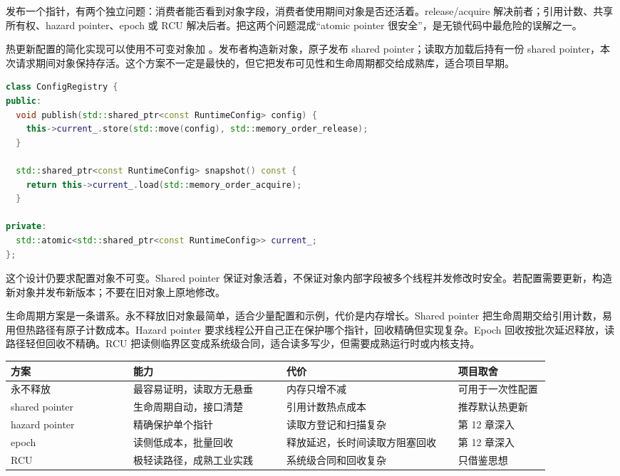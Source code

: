 发布一个指针，有两个独立问题：消费者能否看到对象字段，消费者使用期间对象是否还活着。release/acquire 解决前者；引用计数、共享所有权、hazard pointer、epoch 或 RCU 解决后者。把这两个问题混成“atomic pointer 很安全”，是无锁代码中最危险的误解之一。

热更新配置的简化实现可以使用不可变对象加 。发布者构造新对象，原子发布 shared pointer；读取方加载后持有一份 shared pointer，本次请求期间对象保持存活。这个方案不一定是最快的，但它把发布可见性和生命周期都交给成熟库，适合项目早期。

\begin{lstlisting}[language=C++,caption={热更新配置使用不可变对象和共享所有权}]
class ConfigRegistry {
public:
  void publish(std::shared_ptr<const RuntimeConfig> config) {
    this->current_.store(std::move(config), std::memory_order_release);
  }

  std::shared_ptr<const RuntimeConfig> snapshot() const {
    return this->current_.load(std::memory_order_acquire);
  }

private:
  std::atomic<std::shared_ptr<const RuntimeConfig>> current_;
};
\end{lstlisting}

这个设计仍要求配置对象不可变。Shared pointer 保证对象活着，不保证对象内部字段被多个线程并发修改时安全。若配置需要更新，构造新对象并发布新版本；不要在旧对象上原地修改。

生命周期方案是一条谱系。永不释放旧对象最简单，适合少量配置和示例，代价是内存增长。Shared pointer 把生命周期交给引用计数，易用但热路径有原子计数成本。Hazard pointer 要求线程公开自己正在保护哪个指针，回收精确但实现复杂。Epoch 回收按批次延迟释放，读路径轻但回收不精确。RCU 把读侧临界区变成系统级合同，适合读多写少，但需要成熟运行时或内核支持。

\begin{center}
\begin{tabular}{p{0.20\linewidth}p{0.25\linewidth}p{0.28\linewidth}p{0.15\linewidth}}
\toprule
方案 & 能力 & 代价 & 项目取舍 \\
\midrule
永不释放 & 最容易证明，读取方无悬垂 & 内存只增不减 & 可用于一次性配置 \\
shared pointer & 生命周期自动，接口清楚 & 引用计数热点成本 & 推荐默认热更新 \\
hazard pointer & 精确保护单个指针 & 读取方登记和扫描复杂 & 第 12 章深入 \\
epoch & 读侧低成本，批量回收 & 释放延迟，长时间读取方阻塞回收 & 第 12 章深入 \\
RCU & 极轻读路径，成熟工业实践 & 系统级合同和回收复杂 & 只借鉴思想 \\
\bottomrule
\end{tabular}
\end{center}

